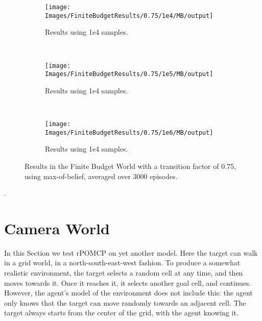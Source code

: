 \begin{figure}[ht]
        \centering
        \begin{subfigure}[t]{0.3\textwidth}
                \texttt{[image: Images/FiniteBudgetResults/0.75/1e4/MB/output]}
                \caption{Results using 1e4 samples.}
                \label{fig:fb4m75}
        \end{subfigure}%
        ~ %
        \begin{subfigure}[t]{0.3\textwidth}
                \texttt{[image: Images/FiniteBudgetResults/0.75/1e5/MB/output]}
                \caption{Results using 1e4 samples.}
                \label{fig:fb5m75}
        \end{subfigure}
        ~ %
        \begin{subfigure}[t]{0.3\textwidth}
                \texttt{[image: Images/FiniteBudgetResults/0.75/1e6/MB/output]}
                \caption{Results using 1e4 samples.}
                \label{fig:fb6m75}
        \end{subfigure}
        \caption{Results in the Finite Budget World with a transition factor of 0.75, using max-of-belief, averaged over 3000 episodes.}
        \label{ref:fbmbfig75}
\end{figure}

.


\clearpage
\section{Camera World}

In this Section we test rPOMCP on yet another model. Here the target can walk in a grid world, in a
north-south-east-west fashion. To produce a somewhat realistic environment, the target selects a
random cell at any time, and then moves towards it. Once it reaches it, it selects another goal
cell, and continues. However, the agent's model of the environment does not include this: the agent
only knows that the target can move randomly towards an adjacent cell. The target always starts from
the center of the grid, with the agent knowing it.

